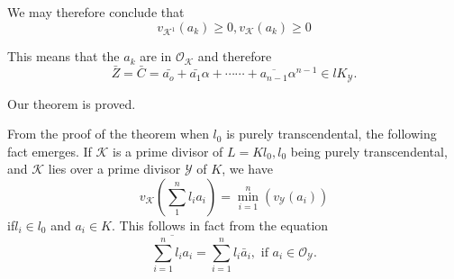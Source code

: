 We may therefore conclude that
$$
v_{\mathscr{K}^1} (a_k) \ge 0, v_{\mathscr{K}} (a_k) \ge 0
$$

This means that the $a_k$ are in $\mathscr{O}_\mathscr{K}$ and therefore
$$
\bar{Z} = \bar{C} = \bar{a_o} + \bar{a_1} \alpha +\cdots \cdots+
\overline{a_{n-1}} \alpha^{n-1} \in lK_\mathscr{Y}. 
$$

Our theorem is proved.

From the proof of the theorem when $l_0$  is purely transcendental,
the following fact emerges. If $\mathscr{K}$ is a prime divisor of $L
= Kl_0, l_0$ being purely transcendental, and $\mathscr{K}$ lies over
a prime divisor $\mathscr{Y}$ of $K$, we have  
$$
v_\mathscr{K} \left(\sum\limits_1^n l_i a_i\right) = \min^n_{i=1}
(v_\mathscr{Y} (a_i)) 
$$
if\pageoriginale $l_i \in l_0$ and $a_i \in K$. This follows in fact
from the equation 
$$
\overline{\sum_{i=1}^{n} l_i a_i}=\sum_{i=1}^{n}l_i \bar{a}_i, \text{ if } a_i
\in \mathscr{O}_\mathscr{Y}. 
$$
